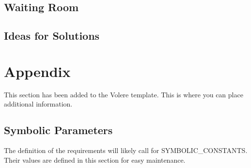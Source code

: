 \documentclass[11pt]{article}
\begin{document}
\subsection{Waiting Room}

\subsection{Ideas for Solutions}





\newpage

\section{Appendix}

This section has been added to the Volere template.  This is where you can place
additional information.

\subsection{Symbolic Parameters}

The definition of the requirements will likely call for SYMBOLIC\_CONSTANTS.
Their values are defined in this section for easy maintenance.
\end{document}
